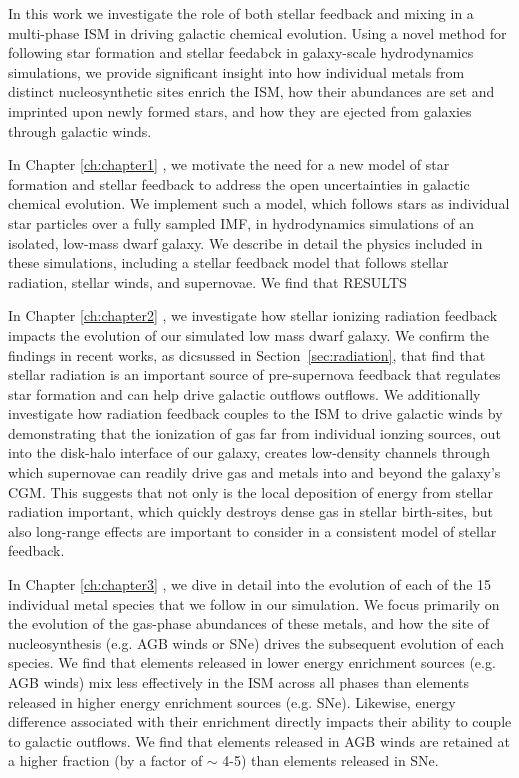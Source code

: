 In this work we investigate the role of both stellar feedback and mixing in a multi-phase ISM in driving galactic chemical evolution. Using a novel method for following star formation and stellar feedabck in galaxy-scale hydrodynamics simulations, we provide significant insight into how individual metals from distinct nucleosynthetic sites enrich the ISM, how their abundances are set and imprinted upon newly formed stars, and how they are ejected from galaxies through galactic winds. 

In Chapter \ref{ch:chapter1} \citep[published as ][]{Emerick2019}, we motivate the need for a new model of star formation and stellar feedback to address the open uncertainties in galactic chemical evolution. We implement such a model, which follows stars as individual star particles over a fully sampled IMF, in hydrodynamics simulations of an isolated, low-mass dwarf galaxy. We describe in detail the physics included in these simulations, including a stellar feedback model that follows stellar radiation, stellar winds, and supernovae. We find that RESULTS

In Chapter \ref{ch:chapter2} \citep[published as ][]{Emerick2018a}, we investigate how stellar ionizing radiation feedback impacts the evolution of our simulated low mass dwarf galaxy. We confirm the findings in recent works, as dicsussed in Section~\ref{sec:radiation}, that find that stellar radiation is an important source of pre-supernova feedback that regulates star formation and can help drive galactic outflows outflows. We additionally investigate how radiation feedback couples to the ISM to drive galactic winds by demonstrating that the ionization of gas far from individual ionzing sources, out into the disk-halo interface of our galaxy, creates low-density channels through which supernovae can readily drive gas and metals into and beyond the galaxy's CGM. This suggests that not only is the local deposition of energy from stellar radiation important, which quickly destroys dense gas in stellar birth-sites, but also long-range effects are important to consider in a consistent model of stellar feedback.

In Chapter \ref{ch:chapter3} \citep[published as ][]{Emerick2018b}, we dive in detail into the evolution of each of the 15 individual metal species that we follow in our simulation. We focus primarily on the evolution of the gas-phase abundances of these metals, and how the site of nucleosynthesis (e.g. AGB winds or SNe) drives the subsequent evolution of each species. We find that elements released in lower energy enrichment sources (e.g. AGB winds) mix less effectively in the ISM across all phases than elements released in higher energy enrichment sources (e.g. SNe). Likewise, energy difference associated with their enrichment directly impacts their ability to couple to galactic outflows. We find that elements released in AGB winds are retained at a higher fraction (by a factor of $\sim$ 4-5) than elements released in SNe. 

